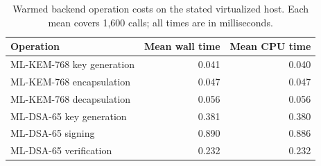 \begin{table}[t]
\centering
\small
\caption{Warmed backend operation costs on the stated virtualized host.
Each mean covers 1,600 calls; all times are in milliseconds.}
\label{tab:primitive-latency}
\begin{tabularx}{\linewidth}{@{}Xrr@{}}
\toprule
Operation & Mean wall time & Mean CPU time\\
\midrule
ML-KEM-768 key generation & 0.041 & 0.040\\
ML-KEM-768 encapsulation & 0.047 & 0.047\\
ML-KEM-768 decapsulation & 0.056 & 0.056\\
ML-DSA-65 key generation & 0.381 & 0.380\\
ML-DSA-65 signing & 0.890 & 0.886\\
ML-DSA-65 verification & 0.232 & 0.232\\
\bottomrule
\end{tabularx}
\end{table}
